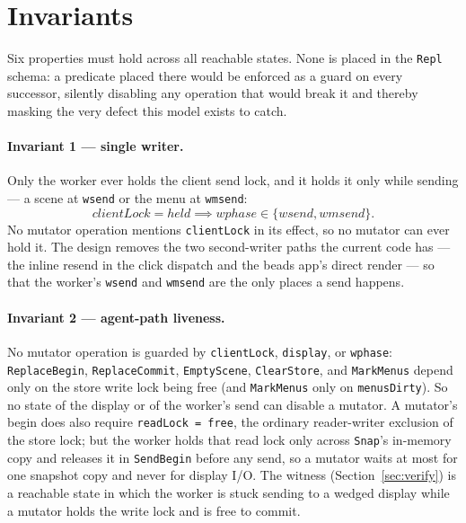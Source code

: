 \documentclass[a4paper,10pt,fleqn]{article}
\begin{document}
\section{Invariants}
\label{sec:inv}

Six properties must hold across all reachable states.  None is placed in
the \texttt{Repl} schema: a predicate placed there would be enforced as a
guard on every successor, silently disabling any operation that would break
it and thereby masking the very defect this model exists to catch.

\paragraph{Invariant 1 --- single writer.}
Only the worker ever holds the client send lock, and it holds it only while
sending --- a scene at \texttt{wsend} or the menu at \texttt{wmsend}:
\[
  clientLock = held \implies wphase \in \{ wsend, wmsend \}.
\]
No mutator operation mentions \texttt{clientLock} in its effect, so no
mutator can ever hold it.  The design removes the two second-writer paths
the current code has --- the inline resend in the click dispatch and the
beads app's direct render --- so that the worker's \texttt{wsend} and
\texttt{wmsend} are the only places a send happens.

\paragraph{Invariant 2 --- agent-path liveness.}
No mutator operation is guarded by \texttt{clientLock}, \texttt{display}, or
\texttt{wphase}: \texttt{ReplaceBegin}, \texttt{ReplaceCommit},
\texttt{EmptyScene}, \texttt{ClearStore}, and \texttt{MarkMenus} depend only on
the store write lock being free (and \texttt{MarkMenus} only on
\texttt{menusDirty}).  So no state of the display or of the worker's send can
disable a mutator.  A mutator's begin does also require \texttt{readLock =
free}, the ordinary reader-writer exclusion of the store lock; but the worker
holds that read lock only across \texttt{Snap}'s in-memory copy and releases
it in \texttt{SendBegin} before any send, so a mutator waits at most for one
snapshot copy and never for display I/O.  The witness
(Section~\ref{sec:verify}) is a reachable state in which the worker is stuck
sending to a wedged display while a mutator holds the write lock and is free
to commit.
\end{document}
